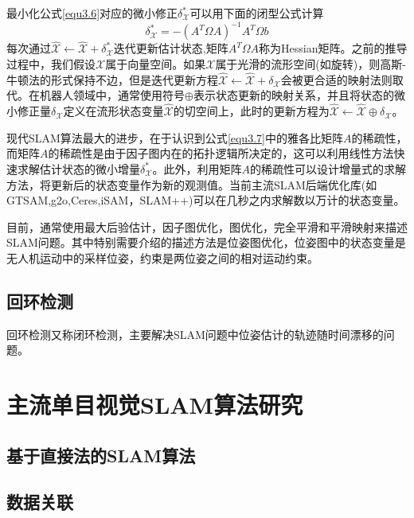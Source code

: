 最小化公式\ref{equ3.6}对应的微小修正$\delta_\mathcal{X}^* $可以用下面的闭型公式计算
\begin{equation}
\label{equ3.7}
\delta_\mathcal{X}^* = - \left( A^T \Omega A \right)^{-1} A^T \Omega b
\end{equation}
每次通过$\hat{\mathcal{X}} \leftarrow \hat{\mathcal{X}}+\delta_\mathcal{X}^*$迭代更新估计状态,矩阵$A^T \Omega A$称为Hessian矩阵。之前的推导过程中，我们假设$\mathcal{X}$属于向量空间。如果$\mathcal{X}$属于光滑的流形空间(如旋转)，则高斯-牛顿法的形式保持不边，但是迭代更新方程$\hat{\mathcal{X}} \leftarrow \hat{\mathcal{X}}+\delta_\mathcal{X}$会被更合适的映射法则取代。在机器人领域中，通常使用符号$\oplus$表示状态更新的映射关系，并且将状态的微小修正量$\delta_\mathcal{X}$定义在流形状态变量$\hat{\mathcal{X}}$的切空间上，此时的更新方程为$\hat{\mathcal{X}}  \leftarrow \hat{\mathcal{X}} \oplus \delta_\mathcal{X}$。

现代SLAM算法最大的进步，在于认识到公式\ref{equ3.7}中的雅各比矩阵$A$的稀疏性，而矩阵$A$的稀疏性是由于因子图内在的拓扑逻辑所决定的，这可以利用线性方法快速求解估计状态的微小增量$\delta_\mathcal{X}^*$。此外，利用矩阵$A$的稀疏性可以设计增量式的求解方法，将更新后的状态变量作为新的观测值。当前主流SLAM后端优化库(如GTSAM,g2o,Ceres,iSAM，SLAM++)可以在几秒之内求解数以万计的状态变量。

目前，通常使用最大后验估计，因子图优化，图优化，完全平滑和平滑映射来描述SLAM问题。其中特别需要介绍的描述方法是位姿图优化，位姿图中的状态变量是无人机运动中的采样位姿，约束是两位姿之间的相对运动约束。

\subsection{回环检测}

回环检测又称闭环检测，主要解决SLAM问题中位姿估计的轨迹随时间漂移的问题。





\section{主流单目视觉SLAM算法研究}

\subsection{基于直接法的SLAM算法}

\subsection*{数据关联}

